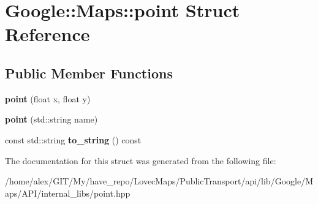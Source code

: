 \hypertarget{structGoogle_1_1Maps_1_1point}{}\section{Google\+:\+:Maps\+:\+:point Struct Reference}
\label{structGoogle_1_1Maps_1_1point}
\subsection*{Public Member Functions}
\begin{DoxyCompactItemize}
\item 
\mbox{\label{structGoogle_1_1Maps_1_1point_abcf782dee7c73565e3db32b3d3d8c3f7}} 
{\bfseries point} (float x, float y)
\item 
\mbox{\label{structGoogle_1_1Maps_1_1point_a57f031ce9ddb5cc80eb5ec3f02ee0641}} 
{\bfseries point} (std\+::string name)
\item 
\mbox{\label{structGoogle_1_1Maps_1_1point_a9cc5bd886bee44b43dbaf9da0adb2ec3}} 
const std\+::string {\bfseries to\+\_\+string} () const
\end{DoxyCompactItemize}


The documentation for this struct was generated from the following file\+:\begin{DoxyCompactItemize}
\item 
/home/alex/\+G\+I\+T/\+My/have\+\_\+repo/\+Lovec\+Maps/\+Public\+Transport/api/lib/\+Google/\+Maps/\+A\+P\+I/internal\+\_\+libs/point.\+hpp\end{DoxyCompactItemize}
